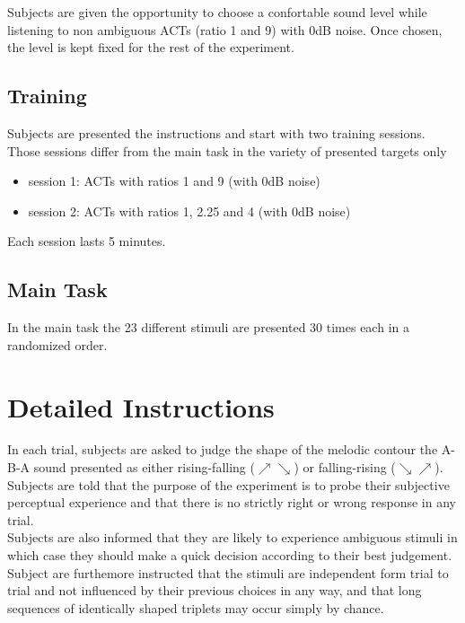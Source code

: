 \documentclass[11pt,a4paper,oneside]{article}
\begin{document}
Subjects are given the opportunity to choose a confortable sound level while listening to non ambiguous ACTs (ratio 1 and 9) with 0dB noise. Once chosen, the level is kept fixed for the rest of the experiment.

\subsection{Training}

Subjects are presented the instructions and start with two training sessions.
Those sessions differ from the main task in the variety of presented targets only
\begin{itemize}
\item session 1: ACTs with ratios 1 and 9 (with 0dB noise)
\item session 2: ACTs with ratios 1, 2.25 and 4 (with 0dB noise)
\end{itemize}

Each session lasts 5 minutes.

\subsection{Main Task}

In the main task the 23 different stimuli are presented 30 times each in a randomized order.

\section{Detailed Instructions}

In each trial, subjects are asked to judge the shape of the melodic contour the A-B-A sound presented as either rising-falling ($\nearrow \searrow$) or falling-rising ($\searrow \nearrow$). \\
Subjects are told that the purpose of the experiment is to probe their subjective perceptual experience and that there is no strictly right or wrong response in any trial.\\
Subjects are also informed that they are likely to experience ambiguous stimuli in which case they should make a quick decision according to their best judgement.\\
Subject are furthemore instructed that the stimuli are independent form trial to trial and not influenced by their previous choices in any way, and that long sequences of identically shaped triplets may occur simply by chance.

\end{document}
